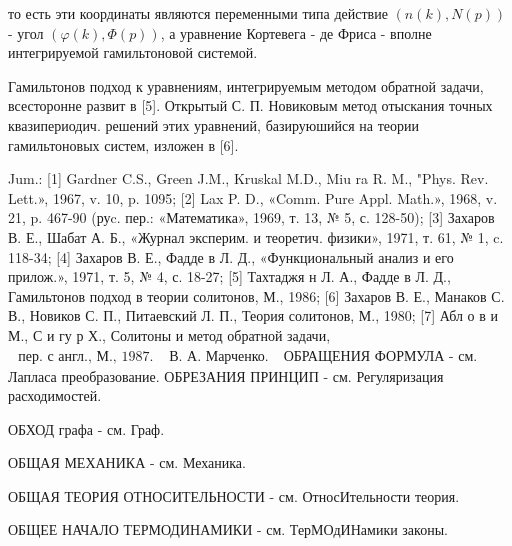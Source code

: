 \documentclass[10pt]{article}
\begin{document}
то есть эти координаты являются переменными типа действие $(n(k), N(p))$ - угол $(\varphi(k), \Phi(p))$, а уравнение Кортевега - де Фриса - вполне интегрируемой гамильтоновой системой.



Гамильтонов подход к уравнениям, интегрируемым методом обратной задачи, всесторонне развит в [5]. Открытый С. П. Новиковым метод отыскания точных квазипериодич. решений этих уравнений, базируюшийся на теории гамильтоновых систем, изложен в [6].



Jum.: [1] Gardner C.S., Green J.M., Kruskal M.D., Miu ra R. M., "Phys. Rev. Lett.», 1967, v. 10, p. 1095; [2] Lax P. D., «Comm. Pure Appl. Math.», 1968, v. 21, p. 467-90 (руc. пер.: «Математика», 1969, т. 13, № 5, с. 128-50); [3] Захаров В. Е., Шабат А. Б., «Журнал эксперим. и теоретич. физики», 1971, т. 61, № 1, c. 118-34; [4] Захаров В. Е., Фадде в Л. Д., «Функциональный анализ и его прилож.», 1971, т. 5, № 4, с. 18-27; [5] Тахтаджя н Л. А., Фадде в Л. Д., Гамильтонов подход в теории солитонов, М., 1986; [6] Захаров В. Е., Манаков С. В., Новиков С. П., Питаевский Л. П., Теория солитонов, М., 1980; [7] Абл о в и М., С и гу р Х., Солитоны и метод обратной задачи, $\begin{array}{ll}\text { пер. с англ., М., } 1987 . & \text { В. А. Марченко. }\end{array}$ ОБРАЩЕНИЯ ФОРМУЛА - см. Лапласа преобразование. ОБРЕЗАНИЯ ПРИНЦИП - см. Регуляризация расходимостей.



ОБХОД графа - см. Граф.



ОБЩАЯ МЕХАНИКА - см. Механика.



ОБЩАЯ ТЕОРИЯ ОТНОСИТЕЛЬНОСТИ - см. ОтносИтельности теория.



ОБЩЕЕ НАЧАЛО ТЕРМОДИНАМИКИ - см. ТерМОдИНамики законы.
\end{document}
